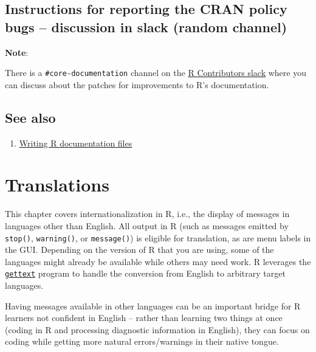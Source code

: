 \documentclass[
]{book}
\providecommand{\tightlist}{%
  \setlength{\itemsep}{0pt}\setlength{\parskip}{0pt}}
\begin{document}
\hypertarget{instructions-for-reporting-the-cran-policy-bugs-discussion-in-slack-random-channel}{%
\section{Instructions for reporting the CRAN policy bugs -- discussion in slack (random channel)}\label{instructions-for-reporting-the-cran-policy-bugs-discussion-in-slack-random-channel}}

\textbf{Note}:

There is a \texttt{\#core-documentation} channel on the \href{https://r-contributors.slack.com/}{R Contributors slack} where you can discuss about the patches for improvements to R's documentation.

\hypertarget{see-also-5}{%
\section{See also}\label{see-also-5}}

\begin{enumerate}
\def\labelenumi{\arabic{enumi}.}
\tightlist
\item
  \href{https://cran.r-project.org/doc/manuals/r-release/R-exts.html\#Writing-R-documentation-files}{Writing R documentation files}
\end{enumerate}

\hypertarget{translations}{%
\chapter{Translations}\label{translations}}

This chapter covers internationalization in R, i.e., the display of messages in languages other than English. All
output in R (such as messages emitted by \texttt{stop()}, \texttt{warning()}, or \texttt{message()}) is eligible for translation, as
are menu labels in the GUI. Depending on the version of R that you are using, some of the languages might already
be available while others may need work. R leverages the \href{https://www.gnu.org/software/gettext/}{\texttt{gettext}} program
to handle the conversion from English to arbitrary target languages.

Having messages available in other languages can be an important bridge for R learners not confident in English --
rather than learning two things at once (coding in R and processing diagnostic information in English), they can
focus on coding while getting more natural errors/warnings in their native tongue.
\end{document}
